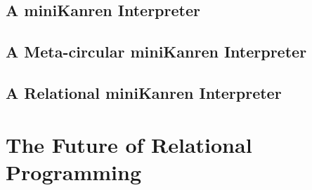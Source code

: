 \documentclass[11pt]{book}
\begin{document}
\begin{schemeregion}
\section{A miniKanren Interpreter}
\section{A Meta-circular miniKanren Interpreter}
\section{A Relational miniKanren Interpreter}

\chapter{The Future of Relational Programming}

\end{schemeregion}
\end{document}
